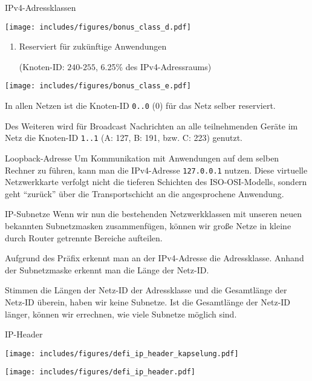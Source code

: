 \begin{defi}{IPv4-Adressklassen}
    \begin{center}
        \texttt{[image: includes/figures/bonus\_class\_d.pdf]}
    \end{center}
    
    \begin{enumerate}[label=Klasse \Alph*:, leftmargin=*, start=5]
        \item Reserviert für zukünftige Anwendungen
              
              (Knoten-ID: $240\text{-}255$, 6.25\% des IPv4-Adressraums)
    \end{enumerate}
    
    \begin{center}
        \texttt{[image: includes/figures/bonus\_class\_e.pdf]}
    \end{center}
    
    In allen Netzen ist die Knoten-ID \texttt{0..0} ($0$) für das Netz selber reserviert.
    
    Des Weiteren wird für Broadcast Nachrichten an alle teilnehmenden Geräte im Netz die Knoten-ID \texttt{1..1} (A: 127, B: 191, bzw. C: 223) genutzt.
\end{defi}

\begin{bonus}{Loopback-Adresse}
    Um Kommunikation mit Anwendungen auf dem selben Rechner zu führen, kann man die IPv4-Adresse \texttt{127.0.0.1} nutzen.
    Diese virtuelle Netzwerkkarte verfolgt nicht die tieferen Schichten des ISO-OSI-Modells, sondern geht \enquote{zurück} über die Transportschicht an die angesprochene Anwendung.
\end{bonus}

\begin{defi}{IP-Subnetze}
    Wenn wir nun die bestehenden Netzwerkklassen mit unseren neuen bekannten Subnetzmasken zusammenfügen, können wir große Netze in kleine durch Router getrennte Bereiche aufteilen.
    
    Aufgrund des Präfix erkennt man an der IPv4-Adresse die Adressklasse.
    Anhand der Subnetzmaske erkennt man die Länge der Netz-ID.
    
    Stimmen die Längen der Netz-ID der Adressklasse und die Gesamtlänge der Netz-ID überein, haben wir keine Subnetze.
    Ist die Gesamtlänge der Netz-ID länger, können wir errechnen, wie viele Subnetze möglich sind.
\end{defi}

\begin{defi}{IP-Header}
    \begin{center}
        \texttt{[image: includes/figures/defi\_ip\_header\_kapselung.pdf]}
        
        \texttt{[image: includes/figures/defi\_ip\_header.pdf]}
    \end{center}
\end{defi}